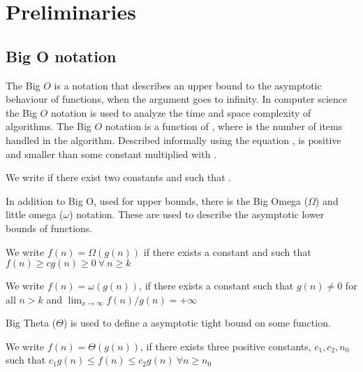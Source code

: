 \section{Preliminaries}

\subsection{Big O notation}

 The Big $O$ is a notation that describes an upper bound to the asymptotic behaviour of functions, when the argument goes to infinity. In computer science the Big $O$ notation is used to analyze the time and space complexity of algorithms. The Big $O$ notation is a function of , where  is the number of items handled in the algorithm. Described informally using the equation ,  is positive and smaller than some constant multiplied with .
 
 \begin{definition}
 We write  if there exist two constants
  and  such that .
 \end{definition}

In addition to Big O, used for upper bounds, there is the Big Omega ($\Omega$) and little omega ($\omega$) notation. These are used to describe the asymptotic lower bounds of functions. 

 \begin{definition}
 We write $f(n) = \Omega(g(n))$ if there exists a constant
  and  such that $f(n) \geq cg(n) \geq 0 \: \forall \: n \geq k$
 \end{definition}

 \begin{definition}
We write $f(n) = \omega(g(n))$, if there exists a constant
   such that $g(n) \neq 0$ for all $n > k$ and $ \lim_{x \to \infty} f(n) / g(n) = + \infty$
 \end{definition}

Big Theta ($\Theta$) is used to define a asymptotic tight bound on some function. 

 \begin{definition}
    We write $f(n) = \Theta(g(n))$, if there exists three positive constants, $c_1, c_2, n_0$ such that $c_1 g(n) \leq f(n) \leq c_2 g(n) \ \forall n \geq n_0$
 \end{definition}



